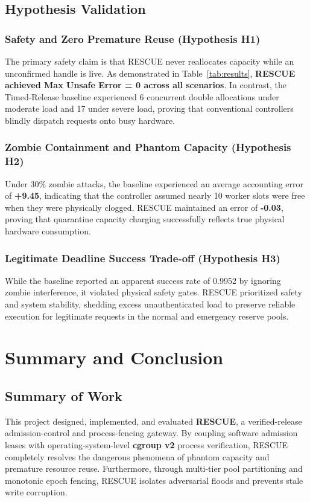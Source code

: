 \documentclass[12pt,a4paper]{report}
\begin{document}
\section{Hypothesis Validation}

\subsection{Safety and Zero Premature Reuse (Hypothesis H1)}
The primary safety claim is that RESCUE never reallocates capacity while an unconfirmed handle is live. As demonstrated in Table~\ref{tab:results}, \textbf{RESCUE achieved Max Unsafe Error = 0 across all scenarios}. In contrast, the Timed-Release baseline experienced 6 concurrent double allocations under moderate load and 17 under severe load, proving that conventional controllers blindly dispatch requests onto busy hardware.

\subsection{Zombie Containment and Phantom Capacity (Hypothesis H2)}
Under 30\% zombie attacks, the baseline experienced an average accounting error of \textbf{+9.45}, indicating that the controller assumed nearly 10 worker slots were free when they were physically clogged. RESCUE maintained an error of \textbf{-0.03}, proving that quarantine capacity charging successfully reflects true physical hardware consumption.

\subsection{Legitimate Deadline Success Trade-off (Hypothesis H3)}
While the baseline reported an apparent success rate of 0.9952 by ignoring zombie interference, it violated physical safety gates. RESCUE prioritized safety and system stability, shedding excess unauthenticated load to preserve reliable execution for legitimate requests in the normal and emergency reserve pools.

\chapter{Summary and Conclusion}

\section{Summary of Work}
This project designed, implemented, and evaluated \textbf{RESCUE}, a verified-release admission-control and process-fencing gateway. By coupling software admission leases with operating-system-level \textbf{cgroup v2} process verification, RESCUE completely resolves the dangerous phenomena of phantom capacity and premature resource reuse. Furthermore, through multi-tier pool partitioning and monotonic epoch fencing, RESCUE isolates adversarial floods and prevents stale write corruption.
\end{document}
